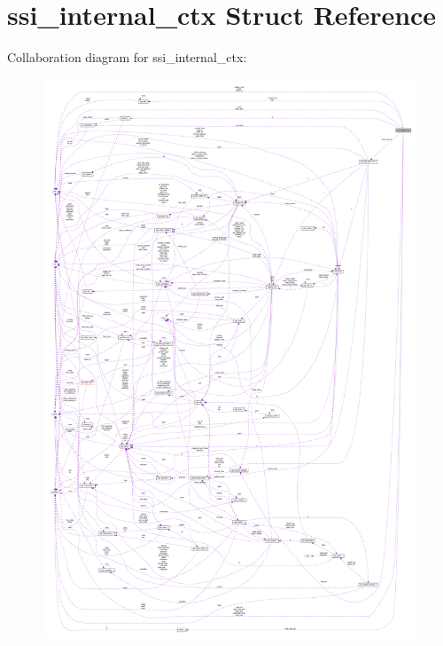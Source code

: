 \hypertarget{structssi__internal__ctx}{}\section{ssi\+\_\+internal\+\_\+ctx Struct Reference}
\label{structssi__internal__ctx}


Collaboration diagram for ssi\+\_\+internal\+\_\+ctx\+:
\nopagebreak
\begin{figure}[H]
\begin{center}
\leavevmode
\includegraphics[width=350pt]{structssi__internal__ctx__coll__graph}
\end{center}
\end{figure}
